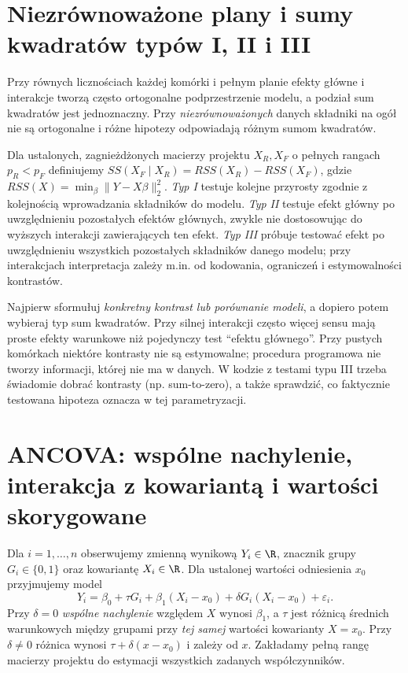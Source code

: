 \section{Niezrównoważone plany i sumy kwadratów typów I, II i III}
Przy równych licznościach każdej komórki i pełnym planie efekty główne i interakcje tworzą często ortogonalne podprzestrzenie modelu, a podział sum kwadratów jest jednoznaczny. Przy \emph{niezrównoważonych} danych składniki na ogół nie są ortogonalne i różne hipotezy odpowiadają różnym sumom kwadratów.

\begin{definicja}\label{def:partial-ss}
Dla ustalonych, zagnieżdżonych macierzy projektu $X_R,X_F$ o pełnych rangach $p_R<p_F$ definiujemy $SS(X_F\mid X_R)=RSS(X_R)-RSS(X_F)$, gdzie $RSS(X)=\min_\beta\|Y-X\beta\|_2^2$. \emph{Typ I} testuje kolejne przyrosty zgodnie z kolejnością wprowadzania składników do modelu. \emph{Typ II} testuje efekt główny po uwzględnieniu pozostałych efektów głównych, zwykle nie dostosowując do wyższych interakcji zawierających ten efekt. \emph{Typ III} próbuje testować efekt po uwzględnieniu wszystkich pozostałych składników danego modelu; przy interakcjach interpretacja zależy m.in. od kodowania, ograniczeń i estymowalności kontrastów.
\end{definicja}

\begin{uwaga}
Najpierw sformułuj \emph{konkretny kontrast lub porównanie modeli}, a dopiero potem wybieraj typ sum kwadratów. Przy silnej interakcji często więcej sensu mają proste efekty warunkowe niż pojedynczy test ``efektu głównego''. Przy pustych komórkach niektóre kontrasty nie są estymowalne; procedura programowa nie tworzy informacji, której nie ma w danych. W kodzie z testami typu III trzeba świadomie dobrać kontrasty (np. sum-to-zero), a także sprawdzić, co faktycznie testowana hipoteza oznacza w tej parametryzacji.
\end{uwaga}

\section{ANCOVA: wspólne nachylenie, interakcja z kowariantą i wartości skorygowane}
\begin{definicja}\label{def:ancova}
Dla $i=1,\ldots,n$ obserwujemy zmienną wynikową $Y_i\in\R$, znacznik grupy $G_i\in\{0,1\}$ oraz kowariantę $X_i\in\R$. Dla ustalonej wartości odniesienia $x_0$ przyjmujemy model
\[
 Y_i=\beta_0+\tau G_i+\beta_1(X_i-x_0)+\delta G_i(X_i-x_0)+\varepsilon_i.
\]
Przy $\delta=0$ \emph{wspólne nachylenie} względem $X$ wynosi $\beta_1$, a $\tau$ jest różnicą średnich warunkowych między grupami przy \emph{tej samej} wartości kowarianty $X=x_0$. Przy $\delta\ne0$ różnica wynosi $\tau+\delta(x-x_0)$ i zależy od $x$. Zakładamy pełną rangę macierzy projektu do estymacji wszystkich zadanych współczynników.
\end{definicja}


